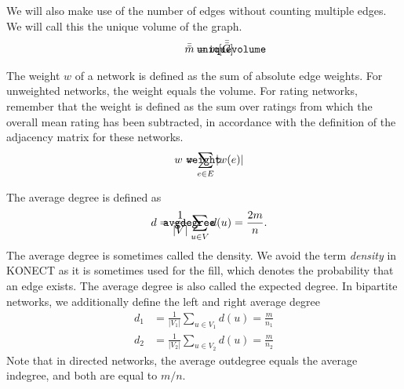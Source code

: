 \documentclass{article}
\def\mathnote#1{%
  \tag*{\rlap{\hspace\marginparsep\smash{\parbox[t]{\marginparwidth}{#1}}}}
}
\begin{document}
We will also make use of the number of edges without counting multiple
edges.  We will call this the unique volume of the graph. 
\begin{align}
  \mathnote{\texttt{uniquevolume}}
  \bar{\bar m} &= m[\bar{\bar{G}}]
\end{align}

The weight $w$ of a network is defined as the sum of absolute edge weights.  For
unweighted networks, the weight equals the volume. For rating networks,
remember that the weight is defined as the sum over ratings from which the overall
mean rating has been subtracted, in accordance with the definition of
the adjacency matrix for these networks. 
\begin{align}
  \mathnote{\texttt{weight}}
  w &= \sum_{e \in E} |w(e)|
\end{align}

The average degree is defined as
\begin{align}
  \mathnote{\texttt{avgdegree}}
  d &= \frac 1 {|V|} \sum_{u\in V} d(u) = \frac {2m} n . 
\end{align}
The average degree is sometimes called the density.  We avoid the term
\emph{density} in KONECT as it is sometimes used for the fill, which
denotes the probability that an edge exists.  The average degree is also
called the expected degree.  
In bipartite networks, we
additionally define the left and right average degree
\begin{align}
  d_1 &= \frac 1 {|V_1|} \sum_{u \in V_1} d(u) = \frac m {n_1} \\
  d_2 &= \frac 1 {|V_2|} \sum_{u \in V_2} d(u) = \frac m {n_2} 
\end{align}
Note that in directed networks, the average outdegree equals the average
indegree, and both are equal to $m/n$. 
\end{document}
